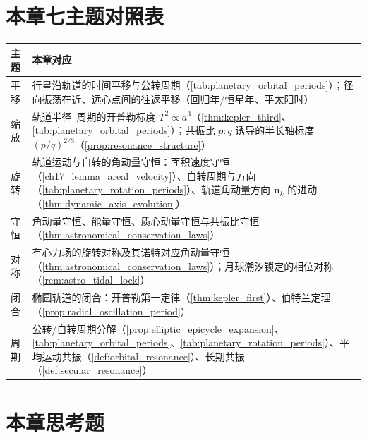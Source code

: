 \section*{本章七主题对照表}
\begin{center}
\begin{tabular}{>{\centering\arraybackslash}p{2.2cm}>{\centering\arraybackslash}p{9.5cm}}
\toprule
主题 & 本章对应 \\
\midrule
平移 & 行星沿轨道的时间平移与公转周期（\cref{tab:planetary_orbital_periods}）；径向振荡在近、远心点间的往返平移（回归年/恒星年、平太阳时） \\
缩放 & 轨道半径--周期的开普勒标度 \(T^2\propto a^3\)（\cref{thm:kepler_third}、\cref{tab:planetary_orbital_periods}）；共振比 \(p:q\) 诱导的半长轴标度 \((p/q)^{2/3}\)（\cref{prop:resonance_structure}） \\
旋转 & 轨道运动与自转的角动量守恒：面积速度守恒（\cref{ch17_lemma_areal_velocity}）、自转周期与方向（\cref{tab:planetary_rotation_periods}）、轨道角动量方向 \(\mathbf n_k\) 的进动（\cref{thm:dynamic_axis_evolution}） \\
守恒 & 角动量守恒、能量守恒、质心动量守恒与共振比守恒（\cref{thm:astronomical_conservation_laws}） \\
对称 & 有心力场的旋转对称及其诺特对应角动量守恒（\cref{thm:astronomical_conservation_laws}）；月球潮汐锁定的相位对称（\cref{rem:astro_tidal_lock}） \\
闭合 & 椭圆轨道的闭合：开普勒第一定律（\cref{thm:kepler_first}）、伯特兰定理（\cref{prop:radial_oscillation_period}） \\
周期 & 公转/自转周期分解（\cref{prop:elliptic_epicycle_expansion}、\cref{tab:planetary_orbital_periods}、\cref{tab:planetary_rotation_periods}）、平均运动共振（\cref{def:orbital_resonance}）、长期共振（\cref{def:secular_resonance}） \\
\bottomrule
\end{tabular}
\end{center}

\section*{本章思考题}

